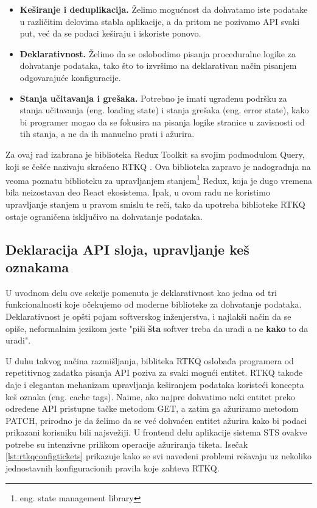 \documentclass[12pt,oneside]{memoir}
\begin{document}
\begin{itemize}
    \item \textbf{Keširanje i deduplikacija.} Želimo mogućnost da dohvatamo iste podatake u različitim delovima stabla aplikacije, a da pritom ne pozivamo API svaki put, već da se podaci keširaju i iskoriste ponovo.
    \item \textbf{Deklarativnost.} Želimo da se oslobodimo pisanja proceduralne logike za dohvatanje podataka, tako što to izvršimo na deklarativan način pisanjem odgovarajuće konfiguracije.
    \item \textbf{Stanja učitavanja i grešaka.} Potrebno je imati ugrađenu podršku za stanja učitavanja (eng. loading state) i stanja grešaka (eng. error state), kako bi programer mogao da se fokusira na pisanja logike stranice u zavisnosti od tih stanja, a ne da ih manuelno prati i ažurira.
\end{itemize}

Za ovaj rad izabrana je biblioteka Redux Toolkit sa svojim podmodulom Query, koji se češće nazivaju skraćeno RTKQ \cite{rtkqdocs}. Ova biblioteka zapravo je nadogradnja na veoma poznatu biblioteku za upravljanjem stanjem\footnote{eng. state management library} Redux, koja je dugo vremena bila neizostavan deo React ekosistema. Ipak, u ovom radu ne koristimo upravljanje stanjem u pravom smislu te reči, tako da upotreba biblioteke RTKQ ostaje ograničena isključivo na dohvatanje podataka.

\subsection{Deklaracija API sloja, upravljanje keš oznakama}
U uvodnom delu ove sekcije pomenuta je deklarativnost kao jedna od tri funkcionalnosti koje očekujemo od moderne biblioteke za dohvatanje podataka. Deklarativnost je opšti pojam softverskog inženjerstva, i najlakši način da se opiše, neformalnim jezikom jeste "piši \textbf{šta} softver treba da uradi a ne \textbf{kako} to da uradi".

U duhu takvog načina razmišljanja, bibliteka RTKQ oslobađa programera od repetitivnog zadatka pisanja API poziva za svaki mogući entitet. RTKQ takođe daje i elegantan mehanizam upravljanja keširanjem podataka koristeći koncepta keš oznaka (eng. cache tags). Naime, ako najpre dohvatimo neki entitet preko određene API pristupne tačke metodom GET, a zatim ga ažuriramo metodom PATCH, prirodno je da želimo da se već dohvaćen entitet ažurira kako bi podaci prikazani korisniku  bili najsvežiji. U frontend delu aplikacije sistema STS ovakve potrebe su intenzivne prilikom operacije ažuriranja tiketa.  Isečak \ref{lst:rtkqconfigtickets} prikazuje kako se svi navedeni problemi rešavaju uz nekoliko jednostavnih konfiguracionih pravila koje zahteva RTKQ.
\end{document}
